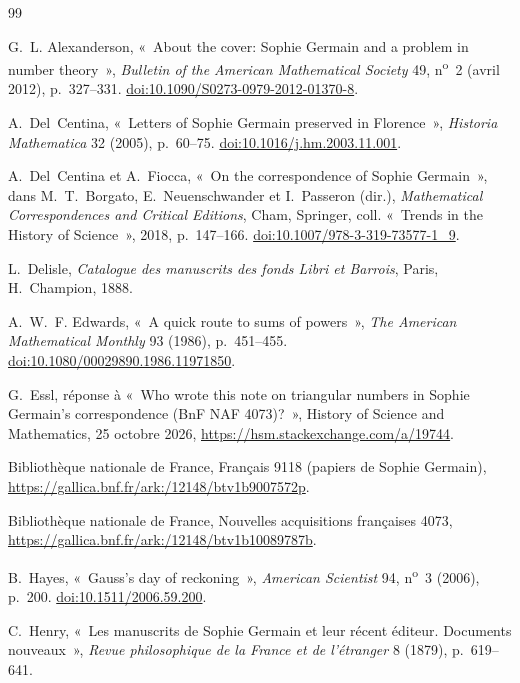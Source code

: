 \documentclass[11pt,a4paper]{article}
\theoremstyle{remark}
\begin{document}
{\small\begin{thebibliography}{99}\setlength{\itemsep}{0pt}\setlength{\parsep}{0pt}

G.~L. Alexanderson, «~About the cover: Sophie Germain and a problem in number
theory~», \emph{Bulletin of the American Mathematical Society} 49, n\textsuperscript{o}~2 (avril 2012),
p.~327--331. \href{https://doi.org/10.1090/S0273-0979-2012-01370-8}{doi:10.1090/S0273-0979-2012-01370-8}.

A.~Del~Centina, «~Letters of Sophie Germain preserved in Florence~»,
\emph{Historia Mathematica} 32 (2005), p.~60--75.
\href{https://doi.org/10.1016/j.hm.2003.11.001}{doi:10.1016/j.hm.2003.11.001}.

A.~Del~Centina et A.~Fiocca, «~On the correspondence of Sophie Germain~»,
dans M.~T.~Borgato, E.~Neuenschwander et I.~Passeron (dir.),
\emph{Mathematical Correspondences and Critical Editions}, Cham, Springer,
coll. «~Trends in the History of Science~», 2018, p.~147--166.
\href{https://doi.org/10.1007/978-3-319-73577-1_9}{doi:10.1007/978-3-319-73577-1\_9}.

L.~Delisle, \emph{Catalogue des manuscrits des fonds Libri et Barrois},
Paris, H.~Champion, 1888.

A.~W.~F. Edwards, «~A quick route to sums of powers~», \emph{The American
Mathematical Monthly} 93 (1986), p.~451--455.
\href{https://doi.org/10.1080/00029890.1986.11971850}{doi:10.1080/00029890.1986.11971850}.

G.~Essl, réponse à «~Who wrote this note on triangular numbers in Sophie
Germain's correspondence (BnF NAF 4073)?~», History of Science and
Mathematics, 25 octobre 2026, \url{https://hsm.stackexchange.com/a/19744}.

Bibliothèque nationale de France, Français 9118 (papiers de Sophie Germain),
\url{https://gallica.bnf.fr/ark:/12148/btv1b9007572p}.

Bibliothèque nationale de France, Nouvelles acquisitions françaises 4073,
\url{https://gallica.bnf.fr/ark:/12148/btv1b10089787b}.

B.~Hayes, «~Gauss's day of reckoning~», \emph{American Scientist} 94,
n\textsuperscript{o}~3 (2006), p.~200.
\href{https://doi.org/10.1511/2006.59.200}{doi:10.1511/2006.59.200}.

C.~Henry, «~Les manuscrits de Sophie Germain et leur récent éditeur.
Documents nouveaux~», \emph{Revue philosophique de la France et de
l'étranger} 8 (1879), p.~619--641.


\end{thebibliography}}
\end{document}
